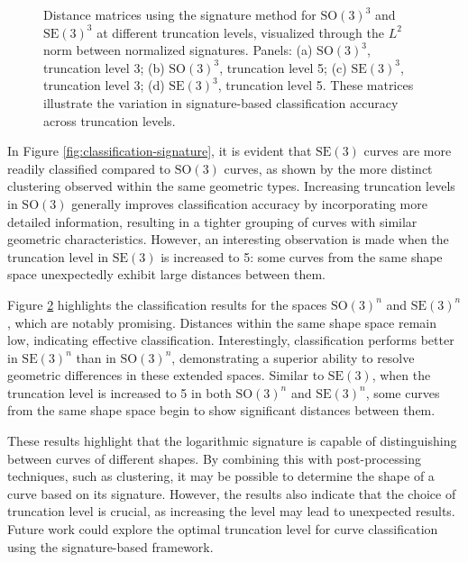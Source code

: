 \begin{figure}
\begin{subfigure}{0.48\textwidth}
        \caption{}
        \label{fig:classification-signature-level5-SE3-3}
    \end{subfigure}
    \caption[Classification using logarithmic signature on in \(\mathrm{SO}(3)^n\) and \(\mathrm{SE}(3)^n\)]{Distance matrices using the signature method for \(\mathrm{SO}(3)^3\) and \(\mathrm{SE}(3)^3\) at different truncation levels, visualized through the \(L^2\) norm between normalized signatures. Panels: (a) \(\mathrm{SO}(3)^3\), truncation level 3; (b) \(\mathrm{SO}(3)^3\), truncation level 5; (c) \(\mathrm{SE}(3)^3\), truncation level 3; (d) \(\mathrm{SE}(3)^3\), truncation level 5. These matrices illustrate the variation in signature-based classification accuracy across truncation levels.}
    \label{fig:classification-signature-3}
\end{figure}

In Figure \ref{fig:classification-signature}, it is evident that \(\mathrm{SE}(3)\) curves are more readily classified compared to \(\mathrm{SO}(3)\) curves, as shown by the more distinct clustering observed within the same geometric types. Increasing truncation levels in \(\mathrm{SO}(3)\) generally improves classification accuracy by incorporating more detailed information, resulting in a tighter grouping of curves with similar geometric characteristics. However, an interesting observation is made when the truncation level in \(\mathrm{SE}(3)\) is increased to 5: some curves from the same shape space unexpectedly exhibit large distances between them.

Figure \ref{fig:classification-signature-3} highlights the classification results for the spaces \(\mathrm{SO}(3)^n\) and \(\mathrm{SE}(3)^n\), which are notably promising. Distances within the same shape space remain low, indicating effective classification. Interestingly, classification performs better in \(\mathrm{SE}(3)^n\) than in \(\mathrm{SO}(3)^n\), demonstrating a superior ability to resolve geometric differences in these extended spaces. Similar to \(\mathrm{SE}(3)\), when the truncation level is increased to 5 in both \(\mathrm{SO}(3)^n\) and \(\mathrm{SE}(3)^n\), some curves from the same shape space begin to show significant distances between them.

These results highlight that the logarithmic signature is capable of distinguishing between curves of different shapes. By combining this with post-processing techniques, such as clustering, it may be possible to determine the shape of a curve based on its signature. However, the results also indicate that the choice of truncation level is crucial, as increasing the level may lead to unexpected results. Future work could explore the optimal truncation level for curve classification using the signature-based framework.

